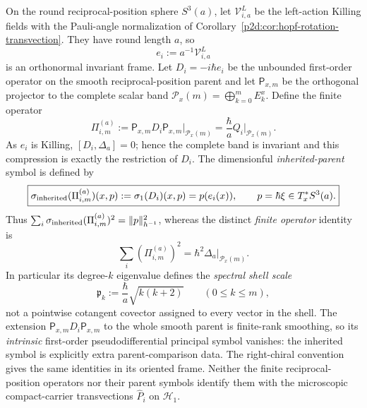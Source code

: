 \documentclass[12pt,a4paper]{article}
\begin{document}
\begin{corollary}
\label{p2d:cor:finite-spatial-momentum-principal-symbol}
On the round reciprocal-position sphere $S^3(a)$, let
$\mathcal V_{i,a}^{L}$ be the left-action Killing fields with the Pauli-angle
normalization of Corollary~\ref{p2d:cor:hopf-rotation-transvection}.  They have
round length $a$, so
\[
 e_i:=a^{-1}\mathcal V_{i,a}^{L}
\]
is an orthonormal invariant frame.  Let $D_i=-i\hbar e_i$ be the unbounded first-order operator on
the smooth reciprocal-position parent and let $\mathsf P_{x,m}$ be
the orthogonal projector to the complete scalar band
$\mathcal P_x(m)=\bigoplus_{k=0}^{m}E_k^x$. Define the finite operator
\begin{equation}
 \label{p2d:eq:finite-spatial-momentum-operator}
 \boxed{\Pi_{i,m}^{(a)}:=\mathsf P_{x,m}D_i\mathsf P_{x,m}
                    \big|_{\mathcal P_x(m)}
       =\frac{\hbar}{a}Q_i\big|_{\mathcal P_x(m)}.}
\end{equation}
As $e_i$ is Killing, $[D_i,\Delta_a]=0$; hence the complete band is
invariant and this compression is exactly the restriction of $D_i$.
The dimensionful \emph{inherited-parent} symbol is defined by
\begin{equation}
 \label{p2d:eq:finite-spatial-momentum-symbol}
 \boxed{\sigma_{\rm inherited}(\Pi_{i,m}^{(a)})(x,p)
             :=\sigma_1(D_i)(x,p)=p(e_i(x)),
        \qquad p=\hbar\xi\in T_x^*S^3(a).}
\end{equation}
Thus $\sum_i\sigma_{\rm inherited}(\Pi_{i,m}^{(a)})^2
=\|p\|_{h^{-1}}^2$, whereas the distinct \emph{finite operator}
identity is
\[
 \boxed{\sum_i(\Pi_{i,m}^{(a)})^2
                 =\hbar^2\Delta_a\big|_{\mathcal P_x(m)}.}
\]
In particular its degree-$k$ eigenvalue defines the \emph{spectral
shell scale}
\[
 \boxed{\mathfrak p_k:=\frac{\hbar}{a}\sqrt{k(k+2)}}
 \qquad(0\le k\le m),
\]
not a pointwise cotangent covector assigned to every vector in the shell.
The extension $\mathsf P_{x,m}D_i\mathsf P_{x,m}$ to the
whole smooth parent is finite-rank smoothing, so its \emph{intrinsic}
first-order pseudodifferential principal symbol vanishes: the inherited
symbol is explicitly extra parent-comparison data.
The right-chiral convention gives the same identities in its oriented
frame. Neither the finite reciprocal-position operators nor their
parent symbols identify them with the microscopic compact-carrier
transvections $\widehat P_i$ on $\mathcal H_1$.
\end{corollary}
\end{document}
